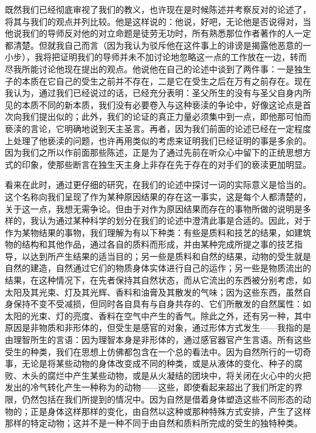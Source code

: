 既然我们已经彻底审视了我们的教义，也许现在是时候陈述并考察反对的论述了，将其与我们的观点并列比较。他是这样说的：他说，好吧，无论他是否说得对，当他说我们的导师反对他的对立命题是徒劳无功时，所有熟悉那位作者著作的人一定都清楚。但就我自己而言（因为我认为驳斥他在这件事上的诽谤是揭露他恶意的一小步），我将把证明我们的导师并未不加讨论地忽略这一点的工作放在一边，转而尽我所能讨论他现在提出的观点。他说他在自己的论述中谈到了两件事：一是独生子的本质在它自己的受生之前并不存在，二是它在受生之后在万有之前存在。现在我认为，通过我们已经说过的话，已经充分表明：圣父所生的没有与圣父自身内所见的本质不同的新本质，我们没有必要卷入与这种亵渎的争论中，好像这论点是首次向我们提出似的；此外，我们的论证的真正力量必须集中到一点，即他那可怕而亵渎的言论，它明确地说到天主圣言。再者，因为我们前面的论述已经在一定程度上处理了他亵渎的问题，也许再用类似的考虑来证明我们已经证明的事是多余的。因为我们之所以作前面那些陈述，正是为了通过先前在听众心中留下的正统思想方式的印象，使那些断言在独生天主身上非存在先于存在的对手们的亵渎更加明显。\par

看来在此时，通过更仔细的研究，在我们的论述中探讨一词的实际意义是恰当的。这个名称向我们呈现了作为某种原因结果的存在这一事实，这是每个人都清楚的，关于这一点，我想无需争论。但由于对作为原因结果而存在的事物所做的说明是多样的，我认为通过某种科学的划分在我们的论述中澄清此事是合适的。因此，对于作为某物结果的事物，我们理解为有以下种类：有些是质料和技艺的结果，如建筑物的结构和其他作品，通过各自的质料而形成，并由某种完成所提之事的技艺指导，以达到所产生结果的适当目的；另一些是质料和自然的结果，动物的受生就是自然的建造，自然通过它们的物质身体实体进行自己的运作；另一些是物质流出的结果，在这种情况下，在先者保持其自然状态，而从它流出的东西被分别考虑，如太阳及其光束、灯及其光辉、香料和油膏及其散发的气味；因为这些东西，虽然自身保持不变不受减损，但同时各自具有与自身共存的、它们所散发的自然属性：如太阳的光束、灯的亮度、香料在空气中产生的香气。除此之外，还有另一种，其中原因是非物质和非形体的，但受生是感官的对象，通过形体方式发生——我指的是由理智所生的言语：因为理智本身是非形体的，通过感官器官产生言语。所有这些受生的种类，我们在思想上仿佛都包含在一个总的看法中。因为自然所行的一切奇事，无论是将某些动物的身体改变成不同的种类，或是从液体的变化、种子的腐败、木头的腐烂中产生某些动物，或是从火凝结的团块中，将关闭在火心中的火把发出的冷气转化产生一种称为的动物——这些，即使看起来超出了我们所定的界限，仍然包括在我们所提到的情况中。因为自然是借着身体塑造这些不同形态的动物的；正是身体这样那样的变化，由自然以这种或那种特殊方式安排，产生了这样那样的特定动物；这并不是一种不同于由自然和质料所完成的受生的独特种类。\par

